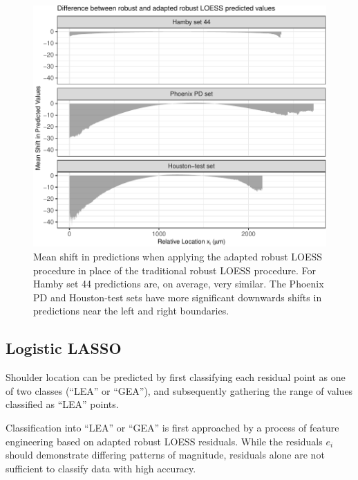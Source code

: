 \documentclass[12pt]{article}
\begin{document}
\begin{figure}
\centering
\includegraphics{writeup_files/figure-latex/adapted-rlo-shift-1.pdf}
\caption{\label{adapted-rlo-shift}Mean shift in predictions when
applying the adapted robust LOESS procedure in place of the traditional
robust LOESS procedure. For Hamby set 44 predictions are, on average,
very similar. The Phoenix PD and Houston-test sets have more significant
downwards shifts in predictions near the left and right boundaries.}
\end{figure}

\subsection{Logistic LASSO}

{\color{purple}{This next section is hard to follow:}}

Shoulder location can be predicted by first classifying each residual
point as one of two classes (``LEA'' or ``GEA''), and subsequently
gathering the range of values classified as ``LEA'' points.

Classification into ``LEA'' or ``GEA'' is first approached by a process
of feature engineering based on adapted robust LOESS residuals. While
the residuals \(e_i\) should demonstrate differing patterns of
magnitude, residuals alone are not sufficient to classify data with high
accuracy. {\color{purple}{Add reason already here.}}
\end{document}
